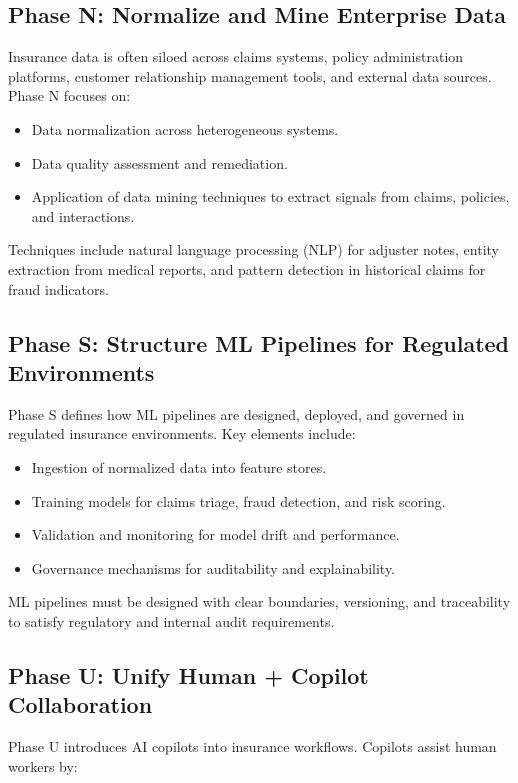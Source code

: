 \documentclass{article}
\begin{document}
\subsection{Phase N: Normalize and Mine Enterprise Data}
Insurance data is often siloed across claims systems, policy administration platforms, customer relationship management tools, and external data sources. Phase N focuses on:

\begin{itemize}
    \item Data normalization across heterogeneous systems.
    \item Data quality assessment and remediation.
    \item Application of data mining techniques to extract signals from claims, policies, and interactions.
\end{itemize}

Techniques include natural language processing (NLP) for adjuster notes, entity extraction from medical reports, and pattern detection in historical claims for fraud indicators.

\subsection{Phase S: Structure ML Pipelines for Regulated Environments}
Phase S defines how ML pipelines are designed, deployed, and governed in regulated insurance environments. Key elements include:

\begin{itemize}
    \item Ingestion of normalized data into feature stores.
    \item Training models for claims triage, fraud detection, and risk scoring.
    \item Validation and monitoring for model drift and performance.
    \item Governance mechanisms for auditability and explainability.
\end{itemize}

ML pipelines must be designed with clear boundaries, versioning, and traceability to satisfy regulatory and internal audit requirements.

\subsection{Phase U: Unify Human + Copilot Collaboration}
Phase U introduces AI copilots into insurance workflows. Copilots assist human workers by:
\end{document}
